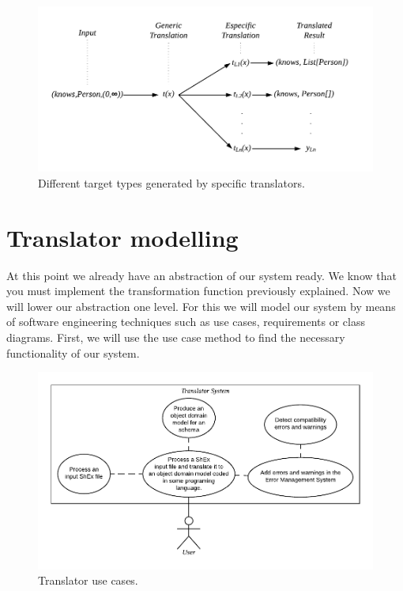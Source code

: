 \begin{figure}
    \includegraphics[scale=0.8]{images/lsc-diagram.pdf}
    \centering
	\caption[Different target types generated by specific translators]{Different target types generated by specific translators.}
    \label{fig:lst-diagram}
\end{figure}

\section{Translator modelling}
At this point we already have an abstraction of our system ready.
We know that you must implement the transformation function previously explained.
Now we will lower our abstraction one level.
For this we will model our system by means of software engineering techniques
such as use cases, requirements or class diagrams. First, we will use the use case
method to find the necessary functionality of our system.

\begin{figure}[h!]
    \includegraphics[scale=0.8]{images/trans-use-case.pdf}
    \centering
    \caption[Translator use cases]{Translator use cases.}
    \label{fig:trans-use-case}
\end{figure}

